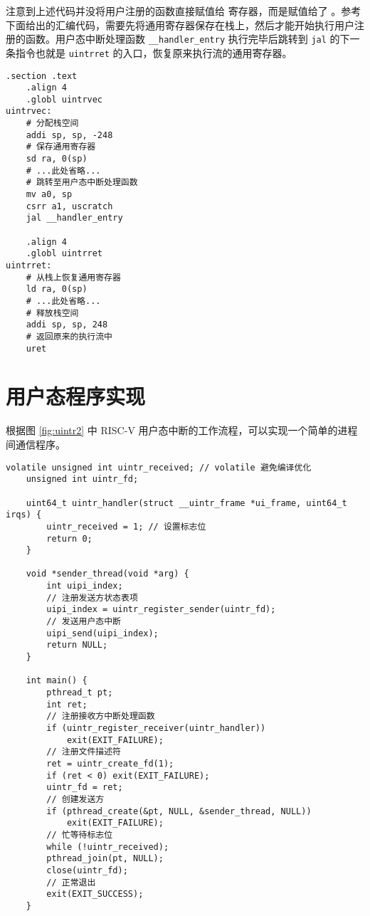 注意到上述代码并没将用户注册的函数直接赋值给 \Rutvec 寄存器，而是赋值给了 \Ruscratch 。参考下面给出的汇编代码，需要先将通用寄存器保存在栈上，然后才能开始执行用户注册的函数。用户态中断处理函数 \texttt{\_\_handler\_entry} 执行完毕后跳转到 \texttt{jal} 的下一条指令也就是 \texttt{uintrret} 的入口，恢复原来执行流的通用寄存器。

\begin{lstlisting}[style=ASMStyle]
    .section .text
    .align 4
    .globl uintrvec
uintrvec:
    # 分配栈空间
    addi sp, sp, -248
    # 保存通用寄存器
    sd ra, 0(sp)
    # ...此处省略...
    # 跳转至用户态中断处理函数
    mv a0, sp
    csrr a1, uscratch
    jal __handler_entry

    .align 4
    .globl uintrret
uintrret:
    # 从栈上恢复通用寄存器
    ld ra, 0(sp)
    # ...此处省略...
    # 释放栈空间
    addi sp, sp, 248
    # 返回原来的执行流中
    uret
\end{lstlisting}

\section{用户态程序实现}

根据图 \ref{fig:uintr2} 中 RISC-V 用户态中断的工作流程，可以实现一个简单的进程间通信程序。

\begin{lstlisting}[style=CStyle]
    volatile unsigned int uintr_received; // volatile 避免编译优化
    unsigned int uintr_fd;

    uint64_t uintr_handler(struct __uintr_frame *ui_frame, uint64_t irqs) {
        uintr_received = 1; // 设置标志位
        return 0;
    }

    void *sender_thread(void *arg) {
        int uipi_index;
        // 注册发送方状态表项
        uipi_index = uintr_register_sender(uintr_fd);
        // 发送用户态中断
        uipi_send(uipi_index);
        return NULL;
    }

    int main() {
        pthread_t pt;
        int ret;
        // 注册接收方中断处理函数
        if (uintr_register_receiver(uintr_handler))
            exit(EXIT_FAILURE);
        // 注册文件描述符
        ret = uintr_create_fd(1);
        if (ret < 0) exit(EXIT_FAILURE);
        uintr_fd = ret;
        // 创建发送方
        if (pthread_create(&pt, NULL, &sender_thread, NULL))
            exit(EXIT_FAILURE);
        // 忙等待标志位
        while (!uintr_received);
        pthread_join(pt, NULL);
        close(uintr_fd);
        // 正常退出
        exit(EXIT_SUCCESS);
    }
\end{lstlisting}

